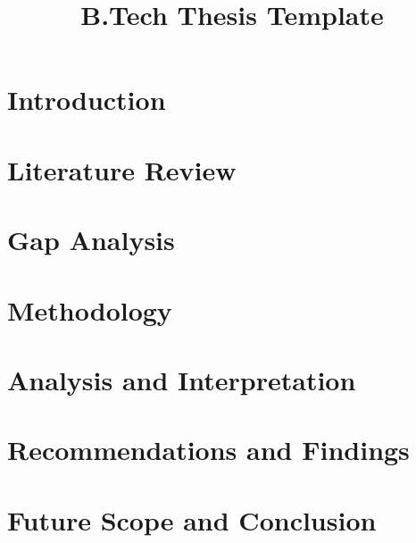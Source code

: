 \documentclass[a4paper,12pt,oneside]{book}
\begin{document}
\title{B.Tech Thesis Template}
\frontmatter
{}



\tableofcontents
\newpage
{}
\listoftables
\newpage
{}
\listoffigures
 
\mainmatter
% 
\chapter{Introduction}

\chapter{Literature Review}

\chapter{Gap Analysis}

\chapter{Methodology}

\chapter{Analysis and Interpretation}

\chapter{Recommendations and Findings}

\chapter{Future Scope and Conclusion}


\newpage


\end{document}
